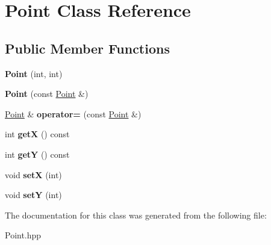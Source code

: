 \hypertarget{classPoint}{}\section{Point Class Reference}
\label{classPoint}
\subsection*{Public Member Functions}
\begin{DoxyCompactItemize}
\item 
\mbox{\label{classPoint_a7e2f39fba71990705aac9ffee1b389b4}} 
{\bfseries Point} (int, int)
\item 
\mbox{\label{classPoint_a5b7ec0fb127734c1cd5c6f350a3990fc}} 
{\bfseries Point} (const \hyperlink{classPoint}{Point} \&)
\item 
\mbox{\label{classPoint_aecfc6968998d806384e24cd93072b024}} 
\hyperlink{classPoint}{Point} \& {\bfseries operator=} (const \hyperlink{classPoint}{Point} \&)
\item 
\mbox{\label{classPoint_ac9d5859db121c7d1b89ca89266dca0a3}} 
int {\bfseries getX} () const
\item 
\mbox{\label{classPoint_a86d10ff46e08462c45b15a8c7ef62d61}} 
int {\bfseries getY} () const
\item 
\mbox{\label{classPoint_a70df49e9bd07a4b86fd7c3fcb72b6fed}} 
void {\bfseries setX} (int)
\item 
\mbox{\label{classPoint_a00952d11c8b02ecf9d584b232edeee42}} 
void {\bfseries setY} (int)
\end{DoxyCompactItemize}


The documentation for this class was generated from the following file\+:\begin{DoxyCompactItemize}
\item 
Point.\+hpp\end{DoxyCompactItemize}
